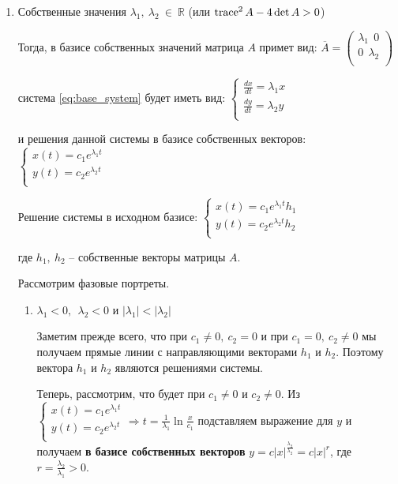 \documentclass[a4paper, 12pt]{article}
\begin{document}
    \begin{enumerate}
      \item Собственные значения  $\lambda_1, ~ \lambda_2 ~ \in ~ \mathbb{R}$ (или $\operatorname{trace}^2 A - 4 \det A > 0$)
      
      Тогда, в базисе собственных значений матрица $A$ примет вид:
      $\overline{A} = 
      \begin{pmatrix}
        \lambda_1 ~~ 0 \\
        0 ~~ \lambda_2 \\
      \end{pmatrix}$

      система \eqref{eq:base_system} будет иметь вид:
      $\begin{cases}
        \frac{d x}{d t} = \lambda_1 x \\
        \frac{d y}{d t} = \lambda_2 y \\        
      \end{cases}$

      и решения данной системы в базисе собственных векторов:
      $\begin{cases}
        x(t) = c_1 e^{\lambda_1 t} \\
        y(t) = c_2 e^{\lambda_2 t} \\
      \end{cases}$

      Решение системы в исходном базисе:
      $\begin{cases}
        x(t) = c_1 e^{\lambda_1 t} h_1 \\
        y(t) = c_2 e^{\lambda_2 t} h_2 \\
      \end{cases}$

      где $h_1, ~ h_2$ -- собственные векторы матрицы $A$.

      Рассмотрим фазовые портреты.

      \begin{enumerate}
        \item $\lambda_1 < 0, ~~ \lambda_2 < 0$ и $|\lambda_1| < |\lambda_2|$
        
        Заметим прежде всего, что при $c_1 \neq 0, ~ c_2 = 0$ и при $c_1 = 0, ~ c_2 \neq 0$ мы получаем прямые линии с направляющими векторами $h_1$ и $h_2$. Поэтому вектора $h_1$ и $h_2$ являются решениями системы.

        Теперь, рассмотрим, что будет при $c_1 \neq 0$ и $c_2 \neq 0$. Из 
        $\displaystyle 
        \begin{cases}
          x(t) = c_1 e^{\lambda_1 t} \\
          y(t) = c_2 e^{\lambda_2 t} \\
        \end{cases} \Rightarrow t = \frac{1}{\lambda_1} \ln{\frac{x}{c_1}}$ подставляем выражение для $y$ и получаем \textbf{в базисе собственных векторов} $\displaystyle y = c |x|^{\frac{\lambda_2}{\lambda_2}} = c |x|^r$, где $\displaystyle r = \frac{\lambda_2}{\lambda_1} > 0$.


\end{enumerate}
\end{enumerate}
\end{document}
